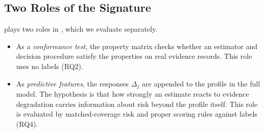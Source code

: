 \subsection{Two Roles of the Signature}
\ers{} plays two roles in \sbg{}, which we evaluate separately.
\begin{itemize}
\item As a \emph{conformance test}, the property matrix checks whether an estimator and decision procedure satisfy the properties on real evidence records. This role uses no labels (RQ2).
\item As \emph{predictive features}, the responses $\Delta_j$ are appended to the profile in the full \cec{} model. The hypothesis is that how strongly an estimate reacts to evidence degradation carries information about risk beyond the profile itself. This role is evaluated by matched-coverage risk and proper scoring rules against labels (RQ4).
\end{itemize}
